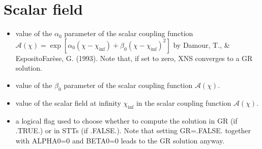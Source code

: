 \documentclass[letterpaper,10pt,english]{sphinxmanual}
\begin{document}
\section{Scalar field}
\label{\detokenize{user_params:scalar-field}}\begin{itemize}
\item {} 
\sphinxAtStartPar
{} \sphinxhyphen{} value of the \(\alpha _0\) parameter of the scalar coupling function \(\mathcal{A}(\chi)=\exp [ \alpha_0 (\chi - \chi _\mathrm{inf}) + \beta _0 (\chi - \chi _\mathrm{inf})^2 ]\) by Damour, T., \& Esposito\sphinxhyphen{}Farèse, G. (1993). Note that, if set to zero, XNS converges to a GR solution.


\item {} 
\sphinxAtStartPar
{} \sphinxhyphen{} value of the \(\beta _0\) parameter of the scalar coupling function \(\mathcal{A}(\chi)\).


\item {} 
\sphinxAtStartPar
{} \sphinxhyphen{} value of the scalar field at infinity \(\chi _\mathrm{inf}\) in the scalar coupling function \(\mathcal{A}(\chi)\).\\


\item {} 
\sphinxAtStartPar
{} \sphinxhyphen{} a logical flag used to choose whether to compute the solution in GR (if .TRUE.) or in STTs (if .FALSE.). Note that setting GR=.FALSE. together with ALPHA0=0 and BETA0=0 leads to the GR solution anyway.

\end{itemize}
\end{document}
